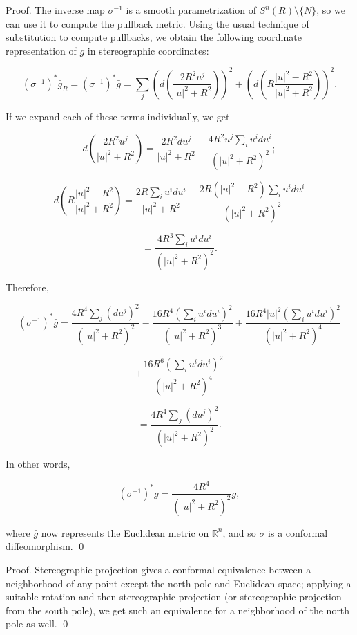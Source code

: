\begin{proposition}
\label{prop:stereographic-conformal-diffeomorphism}

Proof. The inverse map $\sigma^{-1}$ is a smooth parametrization of $S^n(R) \setminus \{N\}$, so we can use it to compute the pullback metric. Using the usual technique of substitution to compute pullbacks, we obtain the following coordinate representation of $\bar{g}$ in stereographic coordinates:

\[(\sigma^{-1})^* \bar{g}_R = (\sigma^{-1})^* \bar{g} = \sum_j \left( d\left(\frac{2R^2 u^j}{|u|^2 + R^2}\right) \right)^2 + \left( d\left( R\frac{|u|^2 - R^2}{|u|^2 + R^2}\right) \right)^2.\]

If we expand each of these terms individually, we get

\[d\left(\frac{2R^2 u^j}{|u|^2 + R^2}\right) = \frac{2R^2 du^j}{|u|^2 + R^2} - \frac{4R^2 u^j \sum_i u^i du^i}{(|u|^2 + R^2)^2};\]

\[d\left( R\frac{|u|^2 - R^2}{|u|^2 + R^2}\right) = \frac{2R\sum_i u^i du^i}{|u|^2 + R^2} - \frac{2R(|u|^2 - R^2) \sum_i u^i du^i}{(|u|^2 + R^2)^2}\]

\[= \frac{4R^3 \sum_i u^i du^i}{(|u|^2 + R^2)^2}.\]

Therefore,

\[(\sigma^{-1})^* \bar{g} = \frac{4R^4 \sum_j (du^j)^2}{(|u|^2 + R^2)^2} - \frac{16R^4 \left(\sum_i u^i du^i\right)^2}{(|u|^2 + R^2)^3} + \frac{16R^4|u|^2 \left(\sum_i u^i du^i\right)^2}{(|u|^2 + R^2)^4}\]

\[+ \frac{16R^6 \left(\sum_i u^i du^i\right)^2}{(|u|^2 + R^2)^4}\]

\[= \frac{4R^4 \sum_j (du^j)^2}{(|u|^2 + R^2)^2}.\]

In other words,

\[(\sigma^{-1})^* \bar{g} = \frac{4R^4}{(|u|^2 + R^2)^2} \bar{g},\]

where $\bar{g}$ now represents the Euclidean metric on $\mathbb{R}^n$, and so $\sigma$ is a conformal diffeomorphism. \qed

\end{proposition}

\begin{corollary}
\label{cor:sphere-round-metric-locally-conformally-flat}

Proof. Stereographic projection gives a conformal equivalence between a neighborhood of any point except the north pole and Euclidean space; applying a suitable rotation and then stereographic projection (or stereographic projection from the south pole), we get such an equivalence for a neighborhood of the north pole as well. \qed

\end{corollary}

